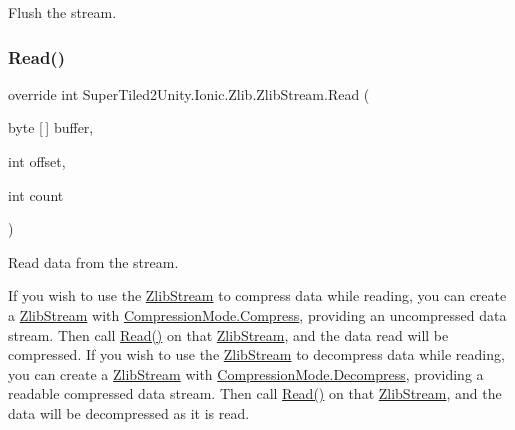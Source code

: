 Flush the stream. 

\mbox{\label{class_super_tiled2_unity_1_1_ionic_1_1_zlib_1_1_zlib_stream_a0987720c2d2c6219e1f1cbd9ae8ee818}} 
\subsubsection{\texorpdfstring{Read()}{Read()}}
{\footnotesize\ttfamily override int Super\+Tiled2\+Unity.\+Ionic.\+Zlib.\+Zlib\+Stream.\+Read (\begin{DoxyParamCaption}\item[{byte \mbox{[}$\,$\mbox{]}}]{buffer,  }\item[{int}]{offset,  }\item[{int}]{count }\end{DoxyParamCaption})}



Read data from the stream. 

If you wish to use the {\ttfamily \mbox{\hyperlink{class_super_tiled2_unity_1_1_ionic_1_1_zlib_1_1_zlib_stream}{Zlib\+Stream}}} to compress data while reading, you can create a {\ttfamily \mbox{\hyperlink{class_super_tiled2_unity_1_1_ionic_1_1_zlib_1_1_zlib_stream}{Zlib\+Stream}}} with {\ttfamily \mbox{\hyperlink{namespace_super_tiled2_unity_1_1_ionic_1_1_zlib_ad5b7635d92497e1c905e5de82eb1c6b1a8fa4fcfcda70410e089984d5f51ae97d}{Compression\+Mode.\+Compress}}}, providing an uncompressed data stream. Then call {\ttfamily \mbox{\hyperlink{class_super_tiled2_unity_1_1_ionic_1_1_zlib_1_1_zlib_stream_a0987720c2d2c6219e1f1cbd9ae8ee818}{Read()}}} on that {\ttfamily \mbox{\hyperlink{class_super_tiled2_unity_1_1_ionic_1_1_zlib_1_1_zlib_stream}{Zlib\+Stream}}}, and the data read will be compressed. If you wish to use the {\ttfamily \mbox{\hyperlink{class_super_tiled2_unity_1_1_ionic_1_1_zlib_1_1_zlib_stream}{Zlib\+Stream}}} to decompress data while reading, you can create a {\ttfamily \mbox{\hyperlink{class_super_tiled2_unity_1_1_ionic_1_1_zlib_1_1_zlib_stream}{Zlib\+Stream}}} with {\ttfamily \mbox{\hyperlink{namespace_super_tiled2_unity_1_1_ionic_1_1_zlib_ad5b7635d92497e1c905e5de82eb1c6b1a6d2861192fdf4370bcf95c099be0f2f0}{Compression\+Mode.\+Decompress}}}, providing a readable compressed data stream. Then call {\ttfamily \mbox{\hyperlink{class_super_tiled2_unity_1_1_ionic_1_1_zlib_1_1_zlib_stream_a0987720c2d2c6219e1f1cbd9ae8ee818}{Read()}}} on that {\ttfamily \mbox{\hyperlink{class_super_tiled2_unity_1_1_ionic_1_1_zlib_1_1_zlib_stream}{Zlib\+Stream}}}, and the data will be decompressed as it is read. 

